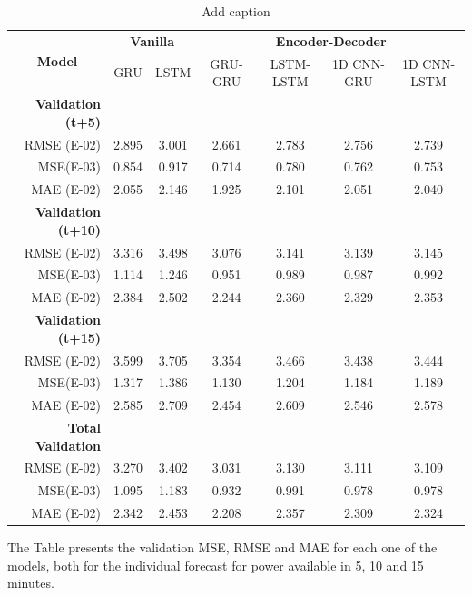 \begin{table}[htbp]
  \centering
  \caption{Add caption}
    \begin{tabular}{r|cc|cccc}
    \multicolumn{1}{c|}{\multirow{2}[1]{*}{\textbf{Model}}} & \multicolumn{2}{c|}{\textbf{Vanilla}} & \multicolumn{4}{c}{\textbf{Encoder-Decoder}} \\
      & GRU & LSTM & GRU-GRU & LSTM-LSTM & 1D CNN-GRU & 1D CNN-LSTM \\
    \midrule
    \textbf{Validation (t+5)} &   &   &   &   &   &  \\
    RMSE (E-02) & 2.895 & 3.001 & 2.661 & 2.783 & 2.756 & 2.739 \\
    MSE(E-03) & 0.854 & 0.917 & 0.714 & 0.780 & 0.762 & 0.753 \\
    MAE (E-02) & 2.055 & 2.146 & 1.925 & 2.101 & 2.051 & 2.040 \\
    \textbf{Validation (t+10)} &   &   &   &   &   &  \\
    RMSE (E-02) & 3.316 & 3.498 & 3.076 & 3.141 & 3.139 & 3.145 \\
    MSE(E-03) & 1.114 & 1.246 & 0.951 & 0.989 & 0.987 & 0.992 \\
    MAE (E-02) & 2.384 & 2.502 & 2.244 & 2.360 & 2.329 & 2.353 \\
    \textbf{Validation (t+15)} &   &   &   &   &   &  \\
    RMSE (E-02) & 3.599 & 3.705 & 3.354 & 3.466 & 3.438 & 3.444 \\
    MSE(E-03) & 1.317 & 1.386 & 1.130 & 1.204 & 1.184 & 1.189 \\
    MAE (E-02) & 2.585 & 2.709 & 2.454 & 2.609 & 2.546 & 2.578 \\
    \midrule
    \textbf{Total Validation} &   &   &   &   &   &  \\
    RMSE (E-02) & 3.270 & 3.402 & 3.031 & 3.130 & 3.111 & 3.109 \\
    MSE(E-03) & 1.095 & 1.183 & 0.932 & 0.991 & 0.978 & 0.978 \\
    MAE (E-02) & 2.342 & 2.453 & 2.208 & 2.357 & 2.309 & 2.324 \\
    \end{tabular}%
  \label{valres}%
\end{table}%





The Table presents the validation \ac{MSE}, \ac{RMSE} and \ac{MAE} for each one of the models, both for the individual forecast for power available in 5, 10 and 15 minutes.



